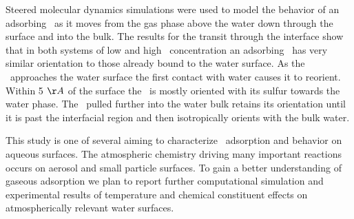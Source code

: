 Steered molecular dynamics simulations were used to model the behavior of an adsorbing \suldiox~as it moves from the gas phase above the water down through the surface and into the bulk. The results for the transit through the interface show that in both systems of low and high \suldiox~concentration an adsorbing \suldiox~has very similar orientation to those already bound to the water surface. As the \suldiox~approaches the water surface the first contact with water causes it to reorient. Within 5 $\AA$ of the surface the \suldiox~is mostly oriented with its sulfur towards the water phase. The \suldiox~pulled further into the water bulk retains its orientation until it is past the interfacial region and then isotropically orients with the bulk water.

This study is one of several aiming to characterize \suldiox~adsorption and behavior on aqueous surfaces. The atmospheric chemistry driving many important reactions occurs on aerosol and small particle surfaces. To gain a better understanding of gaseous adsorption we plan to report further computational simulation and experimental results of temperature and chemical constituent effects on atmospherically relevant water surfaces.
